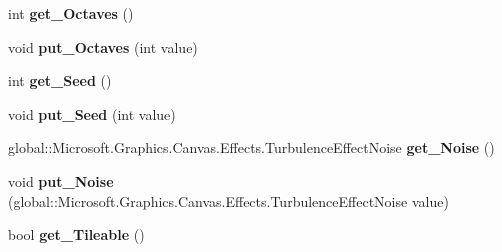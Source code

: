\begin{DoxyCompactItemize}
\item 
\mbox{\label{class_microsoft_1_1_graphics_1_1_canvas_1_1_effects_1_1_turbulence_effect_adc76a70b963e2a88b31d1953618ed24b}} 
int {\bfseries get\+\_\+\+Octaves} ()
\item 
\mbox{\label{class_microsoft_1_1_graphics_1_1_canvas_1_1_effects_1_1_turbulence_effect_aec513446282954b001d8e59dba3cffad}} 
void {\bfseries put\+\_\+\+Octaves} (int value)
\item 
\mbox{\label{class_microsoft_1_1_graphics_1_1_canvas_1_1_effects_1_1_turbulence_effect_a29a04e9d42fdf797395cdfd87bbdcfa2}} 
int {\bfseries get\+\_\+\+Seed} ()
\item 
\mbox{\label{class_microsoft_1_1_graphics_1_1_canvas_1_1_effects_1_1_turbulence_effect_a6e7659f9f3c007f28dcce1d14bbdd44a}} 
void {\bfseries put\+\_\+\+Seed} (int value)
\item 
\mbox{\label{class_microsoft_1_1_graphics_1_1_canvas_1_1_effects_1_1_turbulence_effect_ae13e3952dc96341cc6f8b4396a4d0f69}} 
global\+::\+Microsoft.\+Graphics.\+Canvas.\+Effects.\+Turbulence\+Effect\+Noise {\bfseries get\+\_\+\+Noise} ()
\item 
\mbox{\label{class_microsoft_1_1_graphics_1_1_canvas_1_1_effects_1_1_turbulence_effect_a0439ce3457931371a7e49de7dcd7a919}} 
void {\bfseries put\+\_\+\+Noise} (global\+::\+Microsoft.\+Graphics.\+Canvas.\+Effects.\+Turbulence\+Effect\+Noise value)
\item 
\mbox{\label{class_microsoft_1_1_graphics_1_1_canvas_1_1_effects_1_1_turbulence_effect_af2568a4c8c4b6ac6a1cd5dd2a3ed936c}} 
bool {\bfseries get\+\_\+\+Tileable} ()
\item 
\mbox{\label{class_microsoft_1_1_graphics_1_1_canvas_1_1_effects_1_1_turbulence_effect_a8588799f1b33e53343293169f398a24f}} 

\end{DoxyCompactItemize}
